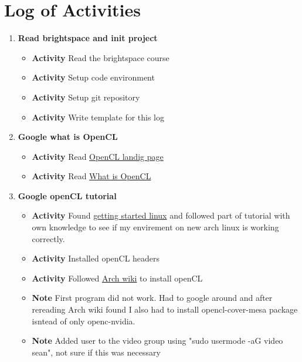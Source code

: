 \documentclass{article}
\begin{document}
\section*{Log of Activities}
\begin{enumerate}
    \item \textbf{Read brightspace and init project}
          \begin{itemize}
              \item \textbf{Activity} Read the brightspace course
              \item \textbf{Activity} Setup code environment
              \item \textbf{Activity} Setup git repository
              \item \textbf{Activity} Write template for this log
          \end{itemize}

    \item \textbf{Google what is OpenCL}
          \begin{itemize}
              \item \textbf{Activity} Read \href{https://www.khronos.org/api/index_2017/opencl/}{OpenCL landig page}
              \item \textbf{Activity} Read \href{https://medium.com/@bcrodrigues/what-is-opencl-14fbec353e09}{What is OpenCL}
          \end{itemize}

    \item \textbf{Google openCL tutorial}
          \begin{itemize}
              \item \textbf{Activity} Found \href{https://github.com/KhronosGroup/OpenCL-Guide/blob/main/chapters/getting_started_linux.md}{getting started linux} and followed part of tutorial with own knowledge to see if my envirement on new arch linux is working correctly.
              \item \textbf{Activity} Installed openCL headers
              \item \textbf{Activity} Followed \href{https://wiki.archlinux.org/title/GPGPU#OpenCL}{Arch wiki} to install openCL
              \item \textbf{Note} First program did not work. Had to google around and after rereading Arch wiki found I also had to install opencl-cover-mesa package isntead of only openc-nvidia.
              \item \textbf{Note} Added user to the video group using "sudo usermode -aG video sean", not sure if this was necessary
          \end{itemize}


\end{enumerate}
\end{document}
